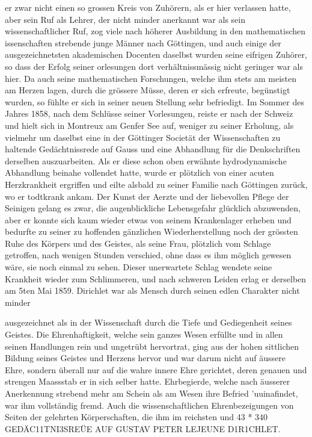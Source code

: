 \documentclass[11pt]{article}
\begin{document}
\noindent er zwar nicht einen so grossen Kreis von Zuhörern, als er hier verlassen hatte, aber sein Ruf als Lehrer, der nicht minder anerkannt war als sein wissenschaftlicher Ruf, zog viele nach höherer Ausbildung in den mathematischen issenschaften strebende junge Männer nach Göttingen, und auch einige der ausgezeichnetsten akademischen Docenten daselbst wurden seine eifrigen Zuhörer, so dass der Erfolg seiner   orlesungen dort verhältnissmässig nicht geringer war als hier. Da auch seine mathematischen Forschungen, welche ihm stets am meisten am Herzen lagen, durch die grössere Müsse, deren er sich erfreute, begünstigt wurden, so fühlte er sich in seiner neuen Stellung sehr befriedigt. Im Sommer des Jahres 1858, nach dem Schlüsse seiner Vorlesungen, reiste er nach der Schweiz und hielt sich in Montreux am Genfer See auf, weniger zu seiner Erholung, als vielmehr um daselbst eine in der Göttinger Societät der Wissenschaften zu haltende Gedächtnissrede auf Gauss und eine Abhandlung für die Denkschriften derselben auszuarbeiten. Als er diese schon oben erwähnte hydrodynamische Abhandlung beinahe vollendet hatte, wurde er plötzlich von einer acuten Herzkrankheit ergriffen und eilte alsbald zu seiner Familie nach Göttingen zurück, wo er todtkrank ankam. Der Kunst der Aerzte und der liebevollen Pflege der Seinigen gelang es zwar, die augenblickliche Lebensgefahr glücklich abzuwenden, aber er konnte sich kaum wieder etwas von seinem Krankenlager erheben und bedurfte zu seiner zu hoffenden gänzlichen Wiederherstellung noch der grössten Ruhe des Körpers und des Geistes, als seine Frau, plötzlich vom Schlage getroffen, nach wenigen Stunden verschied, ohne dass es ihm möglich gewesen wäre, sie noch einmal zu sehen. Dieser unerwartete Schlag wendete seine Krankheit wieder zum Schlimmeren, und nach schweren Leiden erlag er derselben am 5ten Mai 1859. Dirichlet war als Mensch durch seinen edlen Charakter nicht minder
\par

\noindent ausgezeichnet als in der Wissenschaft durch die Tiefe und Gediegenheit seines Geistes. Die Ehrenhaftigkeit, welche sein ganzes Wesen erfüllte und in allen seinen Handlungen rein und ungetrübt hervortrat, ging aus der hohen sittlichen Bildung seines Geistes und Herzens hervor und war darum nicht auf äussere Ehre, sondern überall nur auf die wahre innere Ehre gerichtet, deren genauen und strengen Maassstab er in sich selber hatte. Ehrbegierde, welche nach äusserer Anerkennung strebend mehr am Schein als am Wesen ihre Befried 'uuinafindet, war ihm vollständig fremd. Auch die wissenschaftlichen Ehrenbezeigungen von Seiten der gelehrten Körperschaften, die ihm im reichsten und 43 * 340 GEDÄC11TNI3SREÜE AUF GUSTAV PETER LEJEUNE D1R1CHLET.
\par
\end{document}
